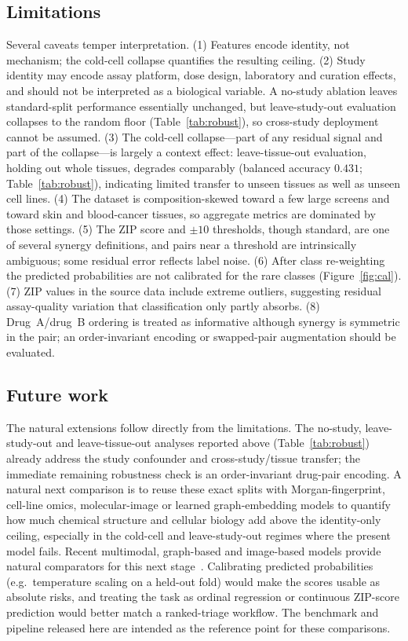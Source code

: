 \documentclass[11pt]{article}
\begin{document}
\subsection{Limitations}
Several caveats temper interpretation. (1) Features encode identity, not mechanism; the cold-cell
collapse quantifies the resulting ceiling. (2) Study identity may encode assay platform, dose design,
laboratory and curation effects, and should not be interpreted as a biological variable. A no-study
ablation leaves standard-split performance essentially unchanged, but leave-study-out evaluation
collapses to the random floor (Table~\ref{tab:robust}), so cross-study deployment cannot be assumed.
(3) The cold-cell collapse---part of any residual signal and part of the
collapse---is largely a context effect: leave-tissue-out evaluation, holding out whole tissues,
degrades comparably (balanced accuracy $0.431$; Table~\ref{tab:robust}), indicating limited transfer to
unseen tissues as well as unseen cell lines. (4) The dataset is composition-skewed
toward a few large screens and toward skin and blood-cancer tissues, so aggregate metrics are dominated
by those settings. (5) The ZIP score and $\pm 10$ thresholds, though standard, are one of several
synergy definitions, and pairs near a threshold are intrinsically ambiguous; some residual error
reflects label noise. (6) After class re-weighting the predicted probabilities are not calibrated for
the rare classes (Figure~\ref{fig:cal}). (7) ZIP values in the source data include extreme outliers,
suggesting residual assay-quality variation that classification only partly absorbs. (8) Drug~A/drug~B
ordering is treated as informative although synergy is symmetric in the pair; an order-invariant
encoding or swapped-pair augmentation should be evaluated.

\subsection{Future work}
The natural extensions follow directly from the limitations. The no-study, leave-study-out and
leave-tissue-out analyses reported above (Table~\ref{tab:robust}) already address the study confounder
and cross-study/tissue transfer; the immediate remaining robustness check is an order-invariant
drug-pair encoding. A natural next comparison is to reuse these exact splits with Morgan-fingerprint,
cell-line omics, molecular-image or learned graph-embedding models to quantify how much chemical
structure and cellular biology add above the identity-only ceiling, especially in the cold-cell and
leave-study-out regimes where the present model fails. Recent
multimodal, graph-based and image-based models provide natural comparators for this next
stage~\cite{monem2024,besharatifard2024,mehrabani2025}. Calibrating predicted probabilities (e.g.\
temperature scaling on a held-out fold) would make the scores usable as absolute risks, and treating
the task as ordinal regression or continuous ZIP-score prediction would better match a ranked-triage
workflow. The benchmark and pipeline released here are intended as the reference point for these
comparisons.
\end{document}
